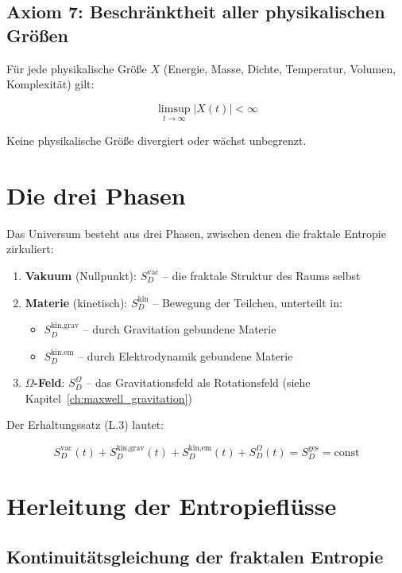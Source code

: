 \subsection{Axiom 7: Beschränktheit aller physikalischen Größen}
\label{sub:fraktale_entropie_axiom7}

Für jede physikalische Größe \( X \) (Energie, Masse, Dichte, Temperatur, Volumen, Komplexität) gilt:

\[
\limsup_{t \to \infty} |X(t)| < \infty \tag{L.7}
\]

Keine physikalische Größe divergiert oder wächst unbegrenzt.

\section{Die drei Phasen}
\label{app:fraktale_entropie_phasen}

Das Universum besteht aus drei Phasen, zwischen denen die fraktale Entropie zirkuliert:

\begin{enumerate}
    \item \textbf{Vakuum} (Nullpunkt): \( S_D^{\text{vac}} \) – die fraktale Struktur des Raums selbst
    \item \textbf{Materie} (kinetisch): \( S_D^{\text{kin}} \) – Bewegung der Teilchen, unterteilt in:
          \begin{itemize}
              \item \( S_D^{\text{kin,grav}} \) – durch Gravitation gebundene Materie
              \item \( S_D^{\text{kin,em}} \) – durch Elektrodynamik gebundene Materie
          \end{itemize}
    \item \textbf{\( \Omega \)-Feld}: \( S_D^{\Omega} \) – das Gravitationsfeld als Rotationsfeld (siehe Kapitel~\ref{ch:maxwell_gravitation})
\end{enumerate}

Der Erhaltungssatz (L.3) lautet:

\[
S_D^{\text{vac}}(t) + S_D^{\text{kin,grav}}(t) + S_D^{\text{kin,em}}(t) + S_D^{\Omega}(t) = S_D^{\text{ges}} = \text{const} \tag{L.8}
\]

\section{Herleitung der Entropieflüsse}
\label{app:fraktale_entropie_fluesse}

\subsection{Kontinuitätsgleichung der fraktalen Entropie}
\label{sub:fraktale_entropie_kontinuitaet}

